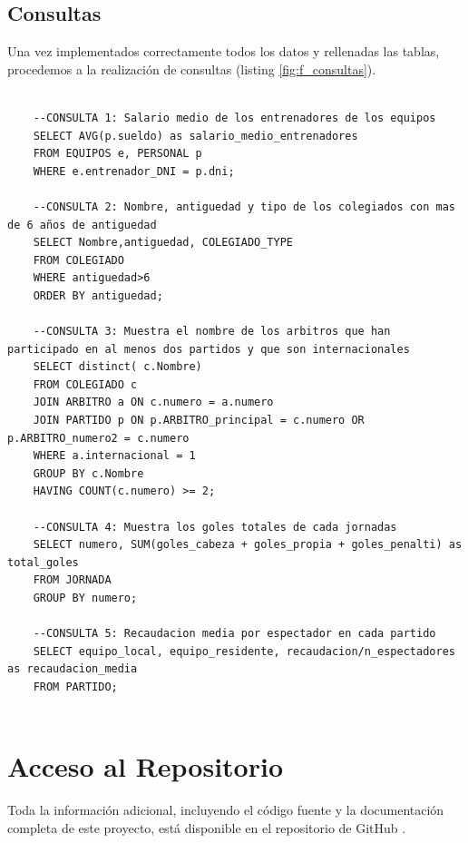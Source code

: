 \documentclass{article}
\begin{document}
\newpage
\subsection{Consultas}
Una vez implementados correctamente todos los datos y rellenadas las tablas, procedemos a la realización de consultas (listing \ref{fig:f_consultas}).
\\


\begin{lstlisting}[style=sqlstyle, label=fig:f_consultas,caption=Consultas Sobre La Liga de Fútbol]
	
	--CONSULTA 1: Salario medio de los entrenadores de los equipos
	SELECT AVG(p.sueldo) as salario_medio_entrenadores
	FROM EQUIPOS e, PERSONAL p 
	WHERE e.entrenador_DNI = p.dni;
	
	--CONSULTA 2: Nombre, antiguedad y tipo de los colegiados con mas de 6 años de antiguedad
	SELECT Nombre,antiguedad, COLEGIADO_TYPE
	FROM COLEGIADO
	WHERE antiguedad>6
	ORDER BY antiguedad;
	
	--CONSULTA 3: Muestra el nombre de los arbitros que han participado en al menos dos partidos y que son internacionales
	SELECT distinct( c.Nombre)
	FROM COLEGIADO c
	JOIN ARBITRO a ON c.numero = a.numero
	JOIN PARTIDO p ON p.ARBITRO_principal = c.numero OR p.ARBITRO_numero2 = c.numero
	WHERE a.internacional = 1
	GROUP BY c.Nombre
	HAVING COUNT(c.numero) >= 2;
	
	--CONSULTA 4: Muestra los goles totales de cada jornadas
	SELECT numero, SUM(goles_cabeza + goles_propia + goles_penalti) as total_goles
	FROM JORNADA
	GROUP BY numero;
	
	--CONSULTA 5: Recaudacion media por espectador en cada partido
	SELECT equipo_local, equipo_residente, recaudacion/n_espectadores as recaudacion_media
	FROM PARTIDO;
	
\end{lstlisting}
	
\newpage
\section{Acceso al Repositorio}

Toda la información adicional, incluyendo el código fuente y la documentación completa de este proyecto, está disponible en el repositorio de GitHub \cite{silva2024github}.

\end{document}
